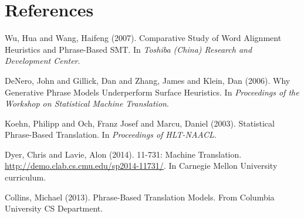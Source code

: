\documentclass[twocolumn]{article}
\begin{document}
\section*{References}
\begin{thebibliography}{99}
    Wu, Hua and Wang, Haifeng
    (2007).
    Comparative Study of Word Alignment Heuristics and Phrase-Based SMT.
    In \emph{Toshiba (China) Research and
      Development Center}.

    DeNero, John and Gillick, Dan and Zhang, James and Klein, Dan
    (2006).
    Why Generative Phrase Models Underperform Surface Heuristics.
    In \emph{Proceedings of the Workshop on Statistical Machine Translation}.

    Koehn, Philipp and Och, Franz Josef and Marcu, Daniel
    (2003).
    Statistical Phrase-Based Translation.
    In \emph{Proceedings of HLT-NAACL}.

    Dyer, Chris and Lavie, Alon
    (2014).
    11-731: Machine Translation.
    \href{http://demo.clab.cs.cmu.edu/sp2014-11731/}
     {\underline{http://demo.clab.cs.cmu.edu/sp2014-11731/}}.
    In Carnegie Mellon University curriculum.

    Collins, Michael
    (2013).
    Phrase-Based Translation Models.
    From Columbia University CS Department.
\end{thebibliography}
\end{document}
